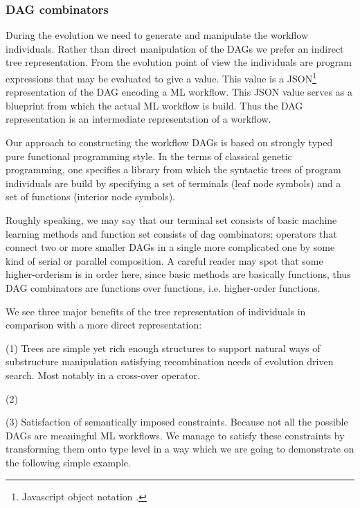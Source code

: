 \documentclass[a4paper,oneside]{memoir}
\begin{document}
\subsubsection{DAG combinators}

During the evolution we need to generate and manipulate the workflow individuals. Rather than direct manipulation of the DAGs we prefer an indirect tree representation. From the evolution point of view the individuals are program expressions that may be  evaluated to give a value. This value is a JSON\footnote{Javascript object notation .} representation of the DAG encoding a ML workflow. This JSON value serves as a blueprint from which the actual ML workflow is build. Thus the DAG representation is an intermediate representation of a workflow.

Our approach to constructing the workflow DAGs is based on strongly typed pure functional programming style. In the terms of classical genetic programming, one specifies a library from which the syntactic trees of program individuals are build by specifying a set of terminals (leaf node symbols) and a set of functions (interior node symbols). 

Roughly speaking, we may say that our terminal set consists of basic machine learning methods and function set consists of dag combinators; operators that connect two or more smaller DAGs in a single more complicated one by some kind of serial or parallel composition. A careful reader may spot that some higher-orderism is in order here, since basic methods are basically functions, thus DAG combinators are functions over functions, i.e. higher-order functions.

We see three major benefits of the tree representation of individuals in comparison with a more direct representation:

(1) Trees are simple yet rich enough structures to support natural ways of substructure manipulation satisfying recombination needs of evolution driven search. Most notably in a cross-over operator. 

(2) 

(3) Satisfaction of semantically imposed constraints. Because not all the possible DAGs are meaningful ML workflows. We manage to satisfy these constraints by transforming them onto type level in a way which we are going to demonstrate on the following simple example.
\end{document}
